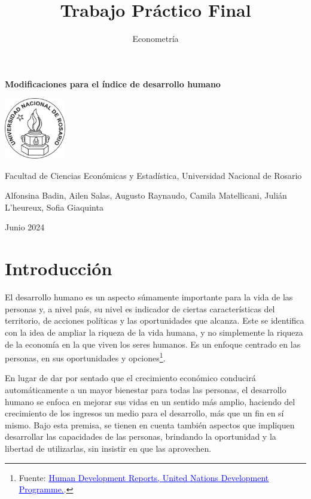 \documentclass[
  10pt,
]{article}
\title{Trabajo Práctico Final}
\author{Econometría}
\date{}
\begin{document}
\maketitle

\renewcommand{\figurename}{Figura}

\begin{center}
    \vspace*{0.5cm}
    \Huge\textbf{Modificaciones para el índice de desarrollo humano}
    
    \vspace{4cm}
    \includegraphics[width=0.2\textwidth]{logo_fceye.png}
  
    \vspace{0cm}
    \large{Facultad de Ciencias Económicas y Estadística, Universidad Nacional de Rosario}
    
    \vspace{0.5cm}
    \large{Alfonsina Badin, Ailen Salas, Augusto Raynaudo, Camila Matellicani, Julián L'heureux, Sofia Giaquinta}
    
    \vspace{0.5cm}
    \large{Junio 2024}
    
\end{center}

\clearpage

\section{Introducción}\label{introducciuxf3n}

El desarrollo humano es un aspecto súmamente importante para la vida de
las personas y, a nivel país, su nivel es indicador de ciertas
características del territorio, de acciones políticas y las
oportunidades que alcanza. Este se identifica con la idea de ampliar la
riqueza de la vida humana, y no simplemente la riqueza de la economía en
la que viven los seres humanos. Es un enfoque centrado en las personas,
en sus oportunidades y opciones\footnote{Fuente:
  \href{https://hdr.undp.org/about/human-development}{\textcolor{blue}{\underline{Human Development Reports, United Nations Development Programme.}}}.}.

En lugar de dar por sentado que el crecimiento económico conducirá
automáticamente a un mayor bienestar para todas las personas, el
desarrollo humano se enfoca en mejorar sus vidas en un sentido más
amplio, haciendo del crecimiento de los ingresos un medio para el
desarrollo, más que un fin en sí mismo. Bajo esta premisa, se tienen en
cuenta también aspectos que impliquen desarrollar las capacidades de las
personas, brindando la oportunidad y la libertad de utilizarlas, sin
insistir en que las aprovechen.
\end{document}
